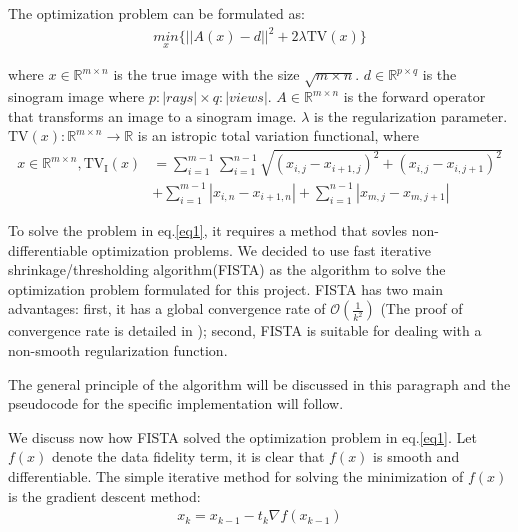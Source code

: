 \documentclass[12pt]{article}
\newcommand{\noin}{\noindent}
\begin{document}
\vspace{0.2in}

\noin The optimization problem can be formulated as:
\begin{align}
 \underset{x}{min}\{ ||A(x) - d||^2 + 2 \lambda\text{TV}(x)\} \label{eq1}
\end{align}

\noin where
$x \in \mathbb{R}^{m \times n}$ is the true image with the size $\sqrt{m \times n}$.
$d \in \mathbb{R}^{p \times q}$ is the sinogram image where $ p:|rays|\times q:|views|$.
$A \in \mathbb{R}^{m \times n}$ is the forward operator that transforms an image to a sinogram image.
$\lambda$ is the regularization parameter. 
$\text{TV}(x): \mathbb{R}^{m\times n} \rightarrow \mathbb{R}$  is an istropic total variation functional, where 
\begin{align}
    x \in \mathbb{R}^{m\times n}, \text{TV}_{\text{I}}(x) &= \sum_{i=1}^{m-1}\sum_{i=1}^{n-1}\sqrt{(x_{i,j} - x_{i+1,j})^2 + (x_{i,j} - x_{i,j+1})^2} \\
    &+ \sum_{i=1}^{m-1}{|x_{i,n} - x_{i+1, n}|} + \sum_{i=1}^{n-1}{|x_{m,j} - x_{m, j+1}|}
\end{align}

\noin To solve the problem in eq.\ref{eq1}, it requires a method that sovles non-differentiable optimization problems. We decided to use fast iterative shrinkage/thresholding algorithm(FISTA) as the algorithm to solve the optimization problem formulated for this project\cite{Beck2009-id}. FISTA has two main advantages: first, it has a global convergence rate of $\mathcal{O}(\frac{1}{k^2})$ (The proof of convergence rate is detailed in \cite{Beck2009-id}); second, FISTA is suitable for dealing with a non-smooth regularization function. 

\vspace{0.2in}

\noin The general principle of the algorithm will be discussed in this paragraph and the pseudocode for the specific implementation will follow. 

\vspace{0.2in}

\noin We discuss now how FISTA solved the optimization problem in eq.\ref{eq1}. Let $f(x)$ denote the data fidelity term, it is clear that $f(x)$ is smooth and differentiable. The simple iterative method for solving the minimization of $f(x)$ is the gradient descent method:
\begin{align}
    x_k = x_{k-1} - t_k \nabla f(x_{k-1})
\end{align}
\end{document}
